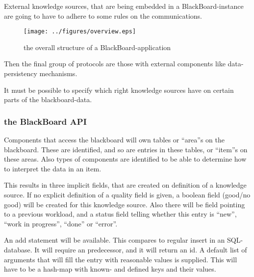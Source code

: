 \documentclass[]{lofar}
\begin{document}
      External knowledge sources, that are being embedded in a
      BlackBoard-instance are going to have to adhere to some rules on
      the communications.

      \begin{figure}
        \texttt{[image: ../figures/overview.eps]}
        \hypertarget{fig:overview}{}
        \caption{the overall structure of a BlackBoard-application\label{fig:overview}}
      \end{figure}

      Then the final group of protocols are those with external
      components like data-persistency mechanisms.

      \begin{requirement}
        It must be possible to specify which right knowledge sources
        have on certain parts of the blackboard-data.
        \caption{data access rights\label{req:data-access-rights}}
        \hypertarget{req:data-access-rights}{}
      \end{requirement}

      \subsubsection{the BlackBoard API}

        Components that access the blackboard will own tables or
        ``area''s on the blackboard. These are identified, and so are
        entries in these tables, or ``item''s on these areas. Also
        types of components are identified to be able to determine how
        to interpret the data in an item.

        This results in three implicit fields, that are created on
        definition of a knowledge source. If no explicit definition of
        a quality field is given, a boolean field (good/no good) will
        be created for this knowledge source. Also there will be field
        pointing to a previous workload, and a status field telling
        whether this entry is ``new'', ``work in progress'', ``done''
        or ``error''.

        An add statement will be available. This compares to regular
        insert in an SQL-database. It will require
        an predecessor, and it will return an id. A default list of
        arguments that will fill the entry with reasonable values is
        supplied. This will have to be a hash-map with known- and
        defined keys and their values.
\end{document}
